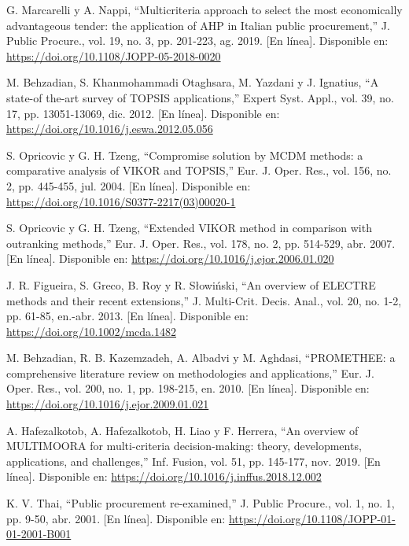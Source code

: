 \documentclass[12pt,a4paper]{article}
\newenvironment{reflist}{%
  \small\sloppy
  \begin{list}{}{%
    \setlength{\leftmargin}{1cm}%
    \setlength{\itemindent}{-1cm}%
    \setlength{\itemsep}{8pt}%
    \setlength{\parsep}{0pt}%
    \setlength{\listparindent}{0pt}%
  }%
}{\end{list}}
\begin{document}
\begin{reflist}
\item[] [24] G. Marcarelli y A. Nappi, ``Multicriteria approach to select the most economically advantageous tender: the application of AHP in Italian public procurement,'' J. Public Procure., vol. 19, no. 3, pp. 201-223, ag. 2019. [En línea]. Disponible en: \url{https://doi.org/10.1108/JOPP-05-2018-0020}

\item[] [25] M. Behzadian, S. Khanmohammadi Otaghsara, M. Yazdani y J. Ignatius, ``A state-of the-art survey of TOPSIS applications,'' Expert Syst. Appl., vol. 39, no. 17, pp. 13051-13069, dic. 2012. [En línea]. Disponible en: \url{https://doi.org/10.1016/j.eswa.2012.05.056}

\item[] [26] S. Opricovic y G. H. Tzeng, ``Compromise solution by MCDM methods: a comparative analysis of VIKOR and TOPSIS,'' Eur. J. Oper. Res., vol. 156, no. 2, pp. 445-455, jul. 2004. [En línea]. Disponible en: \url{https://doi.org/10.1016/S0377-2217(03)00020-1}

\item[] [27] S. Opricovic y G. H. Tzeng, ``Extended VIKOR method in comparison with outranking methods,'' Eur. J. Oper. Res., vol. 178, no. 2, pp. 514-529, abr. 2007. [En línea]. Disponible en: \url{https://doi.org/10.1016/j.ejor.2006.01.020}

\item[] [28] J. R. Figueira, S. Greco, B. Roy y R. Słowiński, ``An overview of ELECTRE methods and their recent extensions,'' J. Multi-Crit. Decis. Anal., vol. 20, no. 1-2, pp. 61-85, en.-abr. 2013. [En línea]. Disponible en: \url{https://doi.org/10.1002/mcda.1482}

\item[] [29] M. Behzadian, R. B. Kazemzadeh, A. Albadvi y M. Aghdasi, ``PROMETHEE: a comprehensive literature review on methodologies and applications,'' Eur. J. Oper. Res., vol. 200, no. 1, pp. 198-215, en. 2010. [En línea]. Disponible en: \url{https://doi.org/10.1016/j.ejor.2009.01.021}

\item[] [30] A. Hafezalkotob, A. Hafezalkotob, H. Liao y F. Herrera, ``An overview of MULTIMOORA for multi-criteria decision-making: theory, developments, applications, and challenges,'' Inf. Fusion, vol. 51, pp. 145-177, nov. 2019. [En línea]. Disponible en: \url{https://doi.org/10.1016/j.inffus.2018.12.002}

\item[] [31] K. V. Thai, ``Public procurement re-examined,'' J. Public Procure., vol. 1, no. 1, pp. 9-50, abr. 2001. [En línea]. Disponible en: \url{https://doi.org/10.1108/JOPP-01-01-2001-B001}


\end{reflist}
\end{document}
